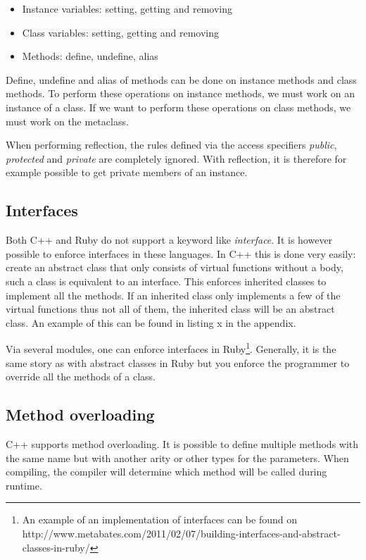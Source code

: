 \documentclass[10pt,a4paper,twocolumn]{article}
\begin{document}
\begin{itemize}
\item Instance variables: setting, getting and removing
\item Class variables: setting, getting and removing
\item Methods: define, undefine, alias
\end{itemize}

Define, undefine and alias of methods can be done on instance methods and class methods. To perform these operations on instance methods, we must work on an instance of a class. If we want to perform these operations on class methods, we must work on the metaclass.

When performing reflection, the rules defined via the access specifiers \textit{public}, \textit{protected} and \textit{private} are completely ignored. With reflection, it is therefore for example possible to get private members of an instance.

\subsection{Interfaces}

Both C++ and Ruby do not support a keyword like \textit{interface}. It is however possible to enforce interfaces in these languages. In C++ this is done very easily: create an abstract class that only consists of virtual functions without a body, such a class is equivalent to an interface. This enforces inherited classes to implement all the methods. If an inherited class only implements a few of the virtual functions thus not all of them, the inherited class will be an abstract class. An example of this can be found in listing x in the appendix.

Via several modules, one can enforce interfaces in Ruby\footnote{An example of an implementation of interfaces can be found on http://www.metabates.com/2011/02/07/building-interfaces-and-abstract-classes-in-ruby/}. Generally, it is the same story as with abstract classes in Ruby but you enforce the programmer to override all the methods of a class.

\subsection{Method overloading}

C++ supports method overloading. It is possible to define multiple methods with the same name but with another arity or other types for the parameters. When compiling, the compiler will determine which method will be called during runtime.
\end{document}
